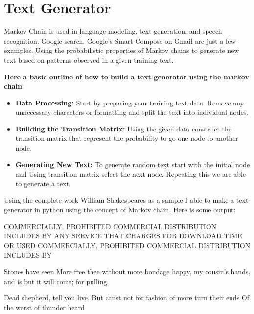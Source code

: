 \section{Text Generator}
Markov Chain is used in language modeling, text generation, and speech recognition. Google search, Google’s Smart Compose on Gmail are just a few examples.
Using the probabilistic properties of Markov chains to generate new text based on patterns observed in a given training text.

\textbf{Here a basic outline of how to build a text generator using the markov chain:}
\begin{itemize}
    \item \textbf{Data Processing:} Start by preparing your training text data. 
        Remove any unnecessary characters or formatting and split the text into individual nodes.
    \item \textbf{Building the Transition Matrix:} Using the given data construct the transition matrix that represent the probability to go 
        one node to another node.
    \item \textbf{Generating New Text:} To generate random text start with the initial node and Using transition matrix select the next node. 
        Repeating this we are able to generate a text.
\end{itemize}

Using the complete work William Shakespeares as a sample I able to make a text generator in python using the concept of Markov chain. Here is some output:

\begin{tcolorbox}[colback=white, colframe=black, sharp corners, boxrule=0.5pt, left=10pt, right=10pt, top=10pt, bottom=10pt]
    \small{COMMERCIALLY. PROHIBITED COMMERCIAL DISTRIBUTION INCLUDES BY ANY SERVICE THAT CHARGES FOR DOWNLOAD TIME OR USED COMMERCIALLY. PROHIBITED COMMERCIAL DISTRIBUTION INCLUDES BY}
\end{tcolorbox}

\begin{tcolorbox}[colback=white, colframe=black, sharp corners, boxrule=0.5pt, left=10pt, right=10pt, top=10pt, bottom=10pt]
    Stones have seen More free thee without more bondage happy, my cousin's hands, and is but it will come; for pulling
\end{tcolorbox}

\begin{tcolorbox}[colback=white, colframe=black, sharp corners, boxrule=0.5pt, left=10pt, right=10pt, top=10pt, bottom=10pt]
Dead shepherd, tell you live. But canst not for fashion of more turn their ends Of the worst of thunder heard
\end{tcolorbox}

